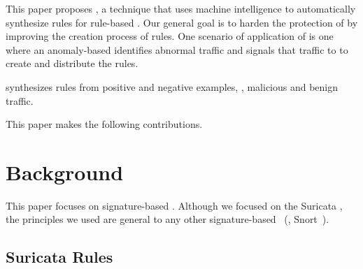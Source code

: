 \documentclass[runningheads]{llncs}
\begin{document}

This paper proposes \tname{}, a technique that uses machine
intelligence to automatically synthesize rules for rule-based
\nids. Our general goal is to harden the protection of \nids by
improving the creation process of rules. One scenario of application
of \tname{} is one where an anomaly-based \nids identifies abnormal
traffic and signals that traffic to \tname{} to create and distribute
the rules.


\tname{} synthesizes rules from positive and negative examples, \ie{},
malicious and benign traffic.



This paper makes the following contributions.

\section{Background}

This paper focuses on signature-based \nids. Although we focused on
the Suricata \nids, the principles we used are general to any other
signature-based \nids~(\eg{}, Snort~\cite{snort}).

\subsection{Suricata Rules}
\label{sec:example-suricata-rules}
\end{document}
